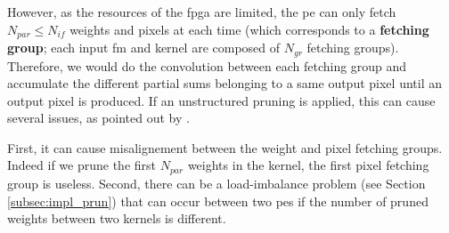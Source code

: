 However, as the resources of the \acrshort{fpga} are limited, the \acrshort{pe} can only fetch $N_{par} \leq N_{if}$ weights and pixels at each time (which corresponds to a \textbf{fetching group}; each input \acrshort{fm} and kernel are composed of $N_{gr}$ fetching groups). Therefore, we would do the convolution between each fetching group and accumulate the different partial sums belonging to a same output pixel until an output pixel is produced. If an unstructured pruning is applied, this can cause several issues, as pointed out by \cite{kang_accelerator-aware_2020}.

First, it can cause misalignement between the weight and pixel fetching groups. Indeed if we prune the first $N_{par}$ weights in the kernel, the first pixel fetching group is useless. Second, there can be a load-imbalance problem (see Section \ref{subsec:impl_prun}) that can occur between two \acrshort{pe}s if the number of pruned weights between two kernels is different. 

